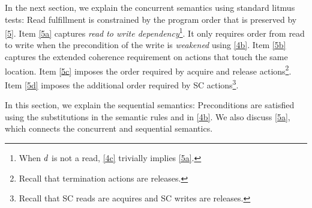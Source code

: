 In the next section, we explain the concurrent semantics using standard
litmus tests: Read fulfillment is constrained by the program order that is
preserved by \ref{5}.  Item \ref{5a} captures \emph{read to write
  dependency}\footnote{When $d$ is not a read, \ref{4c} trivially implies
  \ref{5a}.}.  It only requires order from read to write when the
precondition of the write is \emph{weakened} using \ref{4b}.  Item \ref{5b}
captures the extended coherence requirement on actions that touch the same
location.  Item \ref{5c} imposes the order required by acquire and release
actions\footnote{Recall that termination actions are releases.}.  Item
\ref{5d} imposes the additional order required by SC actions\footnote{Recall
  that SC reads are acquires and SC writes are
  releases.}.  %


In this section, we explain the sequential semantics: Preconditions are
satisfied using the substitutions in the semantic rules and in \ref{4b}.  We
also discuss \ref{5a}, which connects the concurrent and sequential
semantics.

